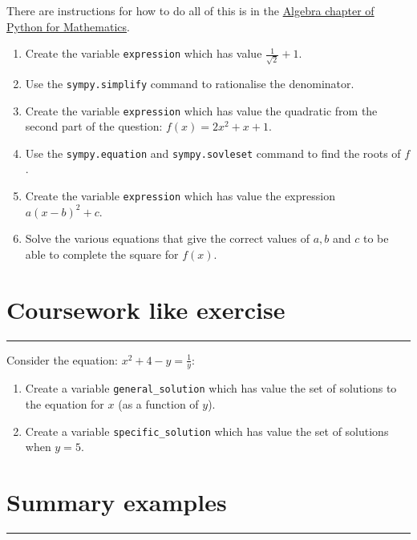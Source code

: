 \documentclass{article}
\begin{document}
There are instructions for how to do all of this is in the
\href{https://vknight.org/pfm/tools-for-mathematics/02-algebra/how/}{Algebra chapter of Python for Mathematics}.


\begin{enumerate}
\item
  Create the variable \texttt{expression} which has value
        $\frac{1}{\sqrt{2}} + 1$.
\item Use the \texttt{sympy.simplify} command to rationalise the
        denominator.
\item Create the variable \texttt{expression} which has value the
        quadratic from the second part of the question: $f(x) = 2x^ 2 + x + 1$.
\item Use the \texttt{sympy.equation} and
        \texttt{sympy.sovleset} command to find the roots of $f$.
\item Create the variable \texttt{expression} which has value the
        expression $a(x-b) ^ 2 + c$.
\item Solve the various equations that give the correct values of $a, b$ and
    $c$ to be able to complete the square for $f(x)$.
\end{enumerate}


\section{Coursework like exercise}
\hrule


Consider the equation: $x ^ 2 + 4 - y = \frac{1}{y}$:

\begin{enumerate}
    \item Create a variable \texttt{general_solution} which has value the set of solutions to
   the equation for $x$ (as a function of $y$).
\item Create a variable \texttt{specific_solution} which has value the set of solutions when $y = 5$. 
\end{enumerate}

\section{Summary examples}
\hrule
\end{document}
